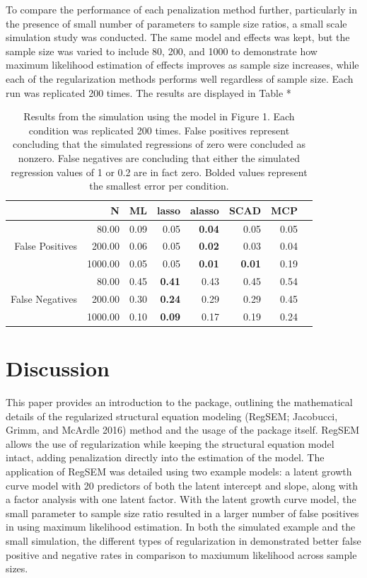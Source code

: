 \documentclass[article]{jss}
\begin{document}
To compare the performance of each penalization method further,
particularly in the presence of small number of parameters to sample
size ratios, a small scale simulation study was conducted. The same
model and effects was kept, but the sample size was varied to include
80, 200, and 1000 to demonstrate how maximum likelihood estimation of
effects improves as sample size increases, while each of the
regularization methods performs well regardless of sample size. Each run
was replicated 200 times. The results are displayed in Table *

\begin{table}[ht]
    \centering
    \begin{tabular}{rrrrrrrr}
        \hline
        & N & ML & lasso & alasso & SCAD & MCP \\ 
        \hline
         & 80.00 & 0.09 & 0.05 & \textbf{0.04} & 0.05 & 0.05 \\ 
        False Positives & 200.00 & 0.06 & 0.05 & \textbf{0.02} & 0.03 & 0.04 \\ 
         & 1000.00 & 0.05 & 0.05 & \textbf{0.01} & \textbf{0.01} & 0.19 \\ 
         & 80.00 & 0.45 & \textbf{0.41} & 0.43 & 0.45 & 0.54 \\ 
        False Negatives & 200.00 & 0.30 & \textbf{0.24} & 0.29 & 0.29 & 0.45 \\ 
         & 1000.00 & 0.10 & \textbf{0.09} & 0.17 & 0.19 & 0.24 \\ 
        \hline
    \end{tabular}
    \caption{Results from the simulation using the model in Figure 1. Each condition was replicated 200 times. False positives represent concluding that the simulated regressions of zero were concluded as nonzero. False negatives are concluding that either the simulated regression values of 1 or 0.2 are in fact zero. Bolded values represent the smallest error per condition.}
\end{table}

\section{Discussion}\label{discussion}

This paper provides an introduction to the  package,
outlining the mathematical details of the regularized structural
equation modeling (RegSEM; Jacobucci, Grimm, and McArdle 2016) method
and the usage of the package itself. RegSEM allows the use of
regularization while keeping the structural equation model intact,
adding penalization directly into the estimation of the model. The
application of RegSEM was detailed using two example models: a latent
growth curve model with 20 predictors of both the latent intercept and
slope, along with a factor analysis with one latent factor. With the
latent growth curve model, the small parameter to sample size ratio
resulted in a larger number of false positives in using maximum
likelihood estimation. In both the simulated example and the small
simulation, the different types of regularization in 
demonstrated better false positive and negative rates in comparison to
maxiumum likelihood across sample sizes.
\end{document}
